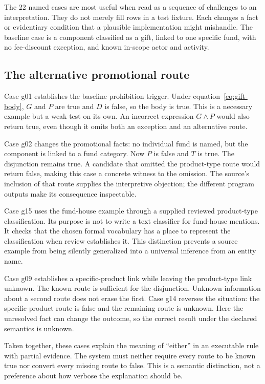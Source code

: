 \documentclass[12pt,a4paper,oneside,openany]{book}
\begin{document}
\label{sec:circular-cases}
The 22 named cases are most useful when read as a sequence of challenges to an
interpretation. They do not merely fill rows in a test fixture. Each changes a
fact or evidentiary condition that a plausible implementation might mishandle.
The baseline case is a component classified as a gift, linked to one specific
fund, with no fee-discount exception, and known in-scope actor and activity.

\subsection{The alternative promotional route}
Case g01 establishes the baseline prohibition trigger. Under
equation~\eqref{eq:gift-body}, $G$ and $P$ are true and $D$ is false, so the
body is true. This is a necessary example but a weak test on its own. An
incorrect expression $G\land P$ would also return true, even though it omits
both an exception and an alternative route.

Case g02 changes the promotional facts: no individual fund is named, but the
component is linked to a fund category. Now $P$ is false and $T$ is true.
The disjunction remains true. A candidate that omitted the product-type route
would return false, making this case a concrete witness to the omission. The
source's inclusion of that route supplies the interpretive objection; the
different program outputs make its consequence inspectable.

Case g15 uses the fund-house example through a supplied reviewed product-type
classification. Its purpose is not to write a text classifier for fund-house
mentions. It checks that the chosen formal vocabulary has a place to represent
the classification when review establishes it. This distinction prevents a
source example from being silently generalized into a universal inference from
an entity name.

Case g09 establishes a specific-product link while leaving the product-type
link unknown. The known route is sufficient for the disjunction. Unknown
information about a second route does not erase the first. Case g14 reverses
the situation: the specific-product route is false and the remaining route is
unknown. Here the unresolved fact can change the outcome, so the correct result
under the declared semantics is unknown.

Taken together, these cases explain the meaning of ``either'' in an executable
rule with partial evidence. The system must neither require every route to be
known true nor convert every missing route to false. This is a semantic
distinction, not a preference about how verbose the explanation should be.
\end{document}
